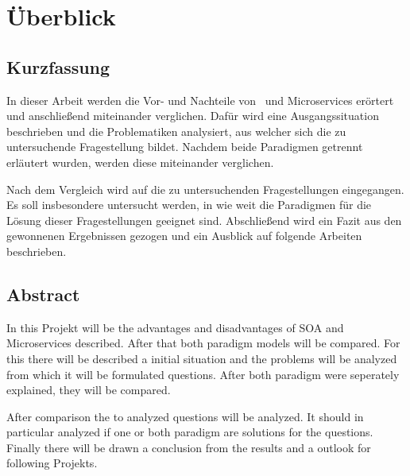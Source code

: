 \chapter*{Überblick}
\section*{Kurzfassung}
In dieser Arbeit werden die Vor- und Nachteile von \SOA\ und Microservices erörtert und anschließend miteinander verglichen. Dafür wird eine Ausgangssituation beschrieben und die Problematiken analysiert, aus welcher sich die zu untersuchende Fragestellung bildet. Nachdem beide Paradigmen getrennt erläutert wurden, werden diese miteinander verglichen.

Nach dem Vergleich wird auf die  zu untersuchenden Fragestellungen eingegangen. Es soll insbesondere untersucht werden, in wie weit die Paradigmen für die Lösung dieser Fragestellungen geeignet sind. Abschließend wird ein Fazit aus den gewonnenen Ergebnissen gezogen und ein Ausblick auf folgende Arbeiten beschrieben.

\section*{Abstract}
In this Projekt will be the advantages and disadvantages of SOA and Microservices described. After that both paradigm models will be compared. For this there will be described a initial situation and the problems will be analyzed from which it will be formulated questions. After both paradigm were seperately explained, they will be compared.

After comparison the to analyzed questions will be analyzed. It should in particular analyzed if one or both paradigm are solutions for the questions. Finally there will be drawn a conclusion from the results and a outlook for following Projekts.